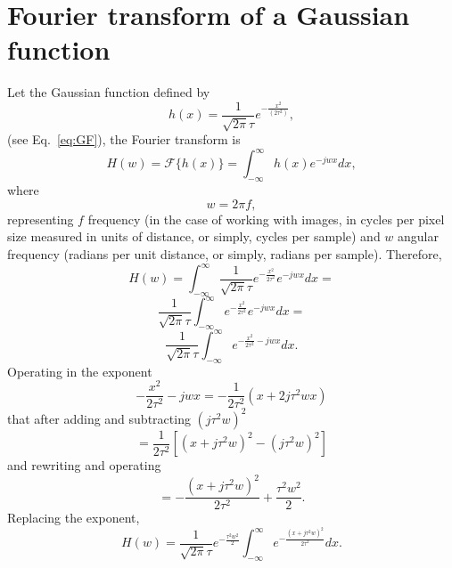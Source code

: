 \documentclass{article}
\begin{document}

\appendix

\section{Fourier transform of a Gaussian function}
\label{ape:FTGF}

Let the Gaussian function defined by
\begin{equation}
  h(x) = \frac{1}{\sqrt{2\pi}\tau}e^{-\frac{{x}^2}{(2\tau^2)}},
  \label{eq:gaussian_ape}
\end{equation}
(see Eq.~\ref{eq:GF}), the Fourier transform  is
\begin{equation}
  H(w) = \mathcal{F}\{h(x)\} = \int_{-\infty}^{\infty}h(x)e^{-jwx}dx,
\end{equation}
where
\begin{equation}
  w = 2\pi f,
\end{equation}
representing $f$ frequency (in the case of working with images, in
cycles per pixel size measured in units of distance, or simply, cycles
per sample) and $w$ angular frequency (radians per unit distance, or
simply, radians per sample). Therefore,
\begin{equation*}
  H(w) = \int_{-\infty}^{\infty}\frac{1}{\sqrt{2\pi}\tau}e^{-\frac{x^2}{2\tau^2}}e^{-jwx}dx = 
\end{equation*}
\begin{equation*}
  \frac{1}{\sqrt{2\pi}\tau}\int_{-\infty}^{\infty}e^{-\frac{x^2}{2\tau^2}}e^{-jwx}dx = 
\end{equation*}
\begin{equation*}
  \frac{1}{\sqrt{2\pi}\tau}\int_{-\infty}^{\infty}e^{-\frac{x^2}{2\tau^2}-jwx}dx.
\end{equation*}
Operating in the exponent
\begin{equation*}
  -\frac{x^2}{2\tau^2}-jwx = -\frac{1}{2\tau^2}(x+2j\tau^2wx)
\end{equation*}
that after adding and subtracting $(j\tau^2w)^2$
\begin{equation*}
  = \frac{1}{2\tau^2}[(x+j\tau^2w)^2-(j\tau^2w)^2]
\end{equation*}
and rewriting and operating
\begin{equation*}
  = -\frac{(x+j\tau^2w)^2}{2\tau^2} + \frac{\tau^2w^2}{2}.
\end{equation*}
Replacing the exponent,
\begin{equation*}
  H(w) = \frac{1}{\sqrt{2\pi}\tau}e^{-\frac{\tau^2w^2}{2}}\int_{-\infty}^{\infty}e^{-\frac{(x+j\tau^2w)^2}{2\tau^2}}dx.
\end{equation*}
\end{document}
